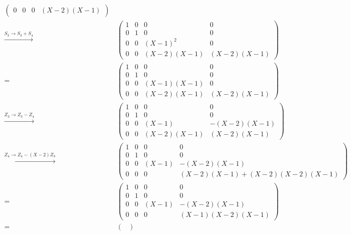 \begin{align*}
\begin{pmatrix}
      0 & 0 &       0 & (X-2)(X-1)
    \end{pmatrix}
  \\
  \xrightarrow{S_3 \to S_3 + S_4}&\,
    \begin{pmatrix}
      1 & 0 &           0 &          0  \\
      0 & 1 &           0 &          0  \\
      0 & 0 &     (X-1)^2 &          0  \\
      0 & 0 &  (X-2)(X-1) & (X-2)(X-1)
    \end{pmatrix}
  \\
  =&\,
    \begin{pmatrix}
      1 & 0 &           0 &          0  \\
      0 & 1 &           0 &          0  \\
      0 & 0 &  (X-1)(X-1) &          0  \\
      0 & 0 &  (X-2)(X-1) & (X-2)(X-1)
    \end{pmatrix}
  \\
  \xrightarrow{Z_3 \to Z_3 - Z_4}&\,
    \begin{pmatrix}
      1 & 0 &           0 &          0  \\
      0 & 1 &           0 &          0  \\
      0 & 0 &       (X-1) & -(X-2)(X-1) \\
      0 & 0 &  (X-2)(X-1) &  (X-2)(X-1)
    \end{pmatrix}
  \\
  \xrightarrow{Z_4 \to Z_4 - (X-2) Z_3}&\,
    \begin{pmatrix}
      1 & 0 &     0 &                             0 \\
      0 & 1 &     0 &                             0 \\
      0 & 0 & (X-1) &                   -(X-2)(X-1) \\
      0 & 0 &     0 &  (X-2)(X-1) + (X-2)(X-2)(X-1)
    \end{pmatrix}
  \\
  =&\,
    \begin{pmatrix}
      1 & 0 &     0 &               0 \\
      0 & 1 &     0 &               0 \\
      0 & 0 & (X-1) &     -(X-2)(X-1) \\
      0 & 0 &     0 & (X-1)(X-2)(X-1)
    \end{pmatrix}
  \\
  =&\,
    \begin{pmatrix}

\end{pmatrix}
\end{align*}
